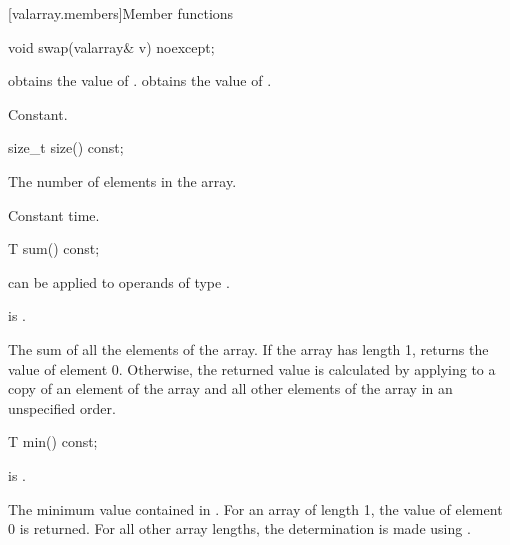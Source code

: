 [valarray.members]{Member functions}

%
\begin{itemdecl}
void swap(valarray& v) noexcept;
\end{itemdecl}

\begin{itemdescr}
\pnum
\effects
{} obtains the value of
.  obtains the value of .

\pnum
\complexity
Constant.
\end{itemdescr}

%
\begin{itemdecl}
size_t size() const;
\end{itemdecl}

\begin{itemdescr}
\pnum
\returns
The number of elements in the array.

\pnum
\complexity
Constant time.
\end{itemdescr}

%
\begin{itemdecl}
T sum() const;
\end{itemdecl}

\begin{itemdescr}
\pnum
\mandates
{} can be applied to operands of type .

\pnum
\expects
{} is .

\pnum
\returns
The sum of all the elements of the array.
If the array has length 1, returns the value of element 0.
Otherwise, the returned value is calculated by applying
to a copy of an element of the array and
all other elements of the array in an unspecified order.%
\end{itemdescr}

%
\begin{itemdecl}
T min() const;
\end{itemdecl}

\begin{itemdescr}
\pnum
\expects
{} is .

\pnum
\returns
The minimum value contained in .
For an array of length 1, the value of element 0 is returned.
For all other array
lengths, the determination is made using
.
\end{itemdescr}

